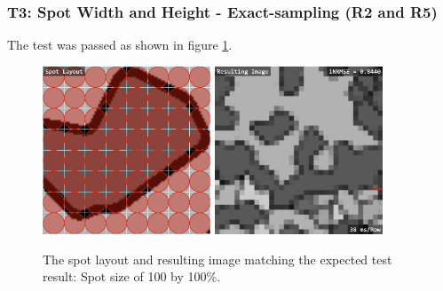 \documentclass[12pt, titlepage]{article}
\begin{document}
\subsubsection{T3: Spot Width and Height - Exact-sampling (R2 and R5)}
The test was passed as shown in figure \ref{fig_t3}.
\begin{figure}[h!]
  \begin{center}
   \includegraphics[width=5cm]{t3a.png}
   \includegraphics[width=5cm]{t3b.png}
  \caption{The spot layout and resulting image matching the expected test result:
  Spot size of 100 by 100\%.}
  \label{fig_t3} 
  \end{center}
\end{figure}
\end{document}
